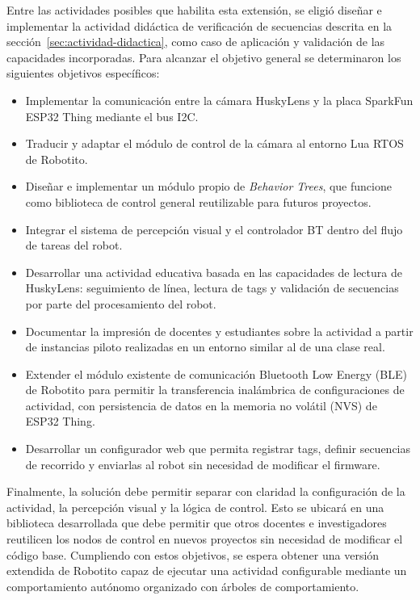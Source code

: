 \documentclass{prgrado}
\begin{document}
Entre las actividades posibles que habilita esta extensión, se eligió diseñar e implementar la actividad didáctica de verificación de secuencias descrita en la sección~\ref{sec:actividad-didactica}, como caso de aplicación y validación de las capacidades incorporadas. Para alcanzar el objetivo general se determinaron los siguientes objetivos específicos:

\begin{itemize}
    \item Implementar la comunicación entre la cámara HuskyLens y la placa SparkFun ESP32 Thing mediante el bus I2C.
    \item Traducir y adaptar el módulo de control de la cámara al entorno Lua RTOS de Robotito.
    \item Diseñar e implementar un módulo propio de \textit{Behavior Trees}, que funcione como biblioteca de control general reutilizable para futuros proyectos.
    \item Integrar el sistema de percepción visual y el controlador BT dentro del flujo de tareas del robot.
    \item Desarrollar una actividad educativa basada en las capacidades de lectura de HuskyLens: seguimiento de línea, lectura de tags y validación de secuencias por parte del procesamiento del robot.
    \item Documentar la impresión de docentes y estudiantes sobre la actividad a partir de instancias piloto realizadas en un entorno similar al de una clase real.
    \item Extender el módulo existente de comunicación Bluetooth Low Energy (BLE) de Robotito para permitir la transferencia inalámbrica de configuraciones de actividad, con persistencia de datos en la memoria no volátil (NVS) de ESP32 Thing.
    \item Desarrollar un configurador web que permita registrar tags, definir secuencias de recorrido y enviarlas al robot sin necesidad de modificar el firmware.
\end{itemize}


Finalmente, la solución debe permitir separar con claridad la configuración de la actividad, la percepción visual y la lógica de control. Esto se ubicará en una biblioteca desarrollada que debe permitir que otros docentes e investigadores reutilicen los nodos de control en nuevos proyectos sin necesidad de modificar el código base. Cumpliendo con estos objetivos, se espera obtener una versión extendida de Robotito capaz de ejecutar una actividad configurable mediante un comportamiento autónomo organizado con árboles de comportamiento. 
\end{document}
